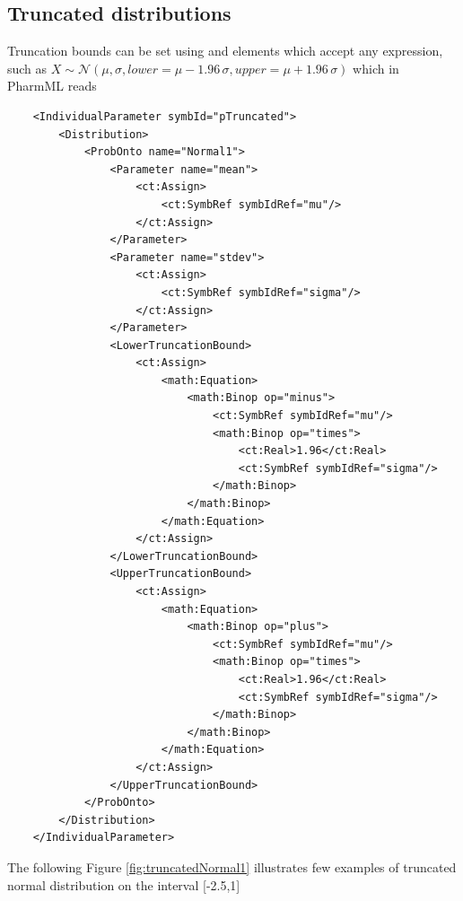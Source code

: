 \subsection{Truncated distributions}
Truncation bounds can be set using  and 
 elements which accept any expression, such as
$X \sim \mathcal N(\mu,\sigma,lower=\mu-1.96\,\sigma,upper=\mu+1.96\,\sigma)$
which in PharmML reads
\lstset{language=XML}
\begin{lstlisting}
    <IndividualParameter symbId="pTruncated">
        <Distribution>
            <ProbOnto name="Normal1">
                <Parameter name="mean">
                    <ct:Assign>
                        <ct:SymbRef symbIdRef="mu"/>
                    </ct:Assign>
                </Parameter>
                <Parameter name="stdev">
                    <ct:Assign>
                        <ct:SymbRef symbIdRef="sigma"/>
                    </ct:Assign>
                </Parameter>
                <LowerTruncationBound>
                    <ct:Assign>
                        <math:Equation>
                            <math:Binop op="minus">
                                <ct:SymbRef symbIdRef="mu"/>
                                <math:Binop op="times">
                                    <ct:Real>1.96</ct:Real>
                                    <ct:SymbRef symbIdRef="sigma"/>
                                </math:Binop>
                            </math:Binop>
                        </math:Equation>
                    </ct:Assign>
                </LowerTruncationBound>
                <UpperTruncationBound>
                    <ct:Assign>
                        <math:Equation>
                            <math:Binop op="plus">
                                <ct:SymbRef symbIdRef="mu"/>
                                <math:Binop op="times">
                                    <ct:Real>1.96</ct:Real>
                                    <ct:SymbRef symbIdRef="sigma"/>
                                </math:Binop>
                            </math:Binop>
                        </math:Equation>
                    </ct:Assign>
                </UpperTruncationBound>
            </ProbOnto>
        </Distribution>
    </IndividualParameter>
\end{lstlisting}
The following Figure \ref{fig:truncatedNormal1} illustrates few examples of truncated 
normal distribution on the interval [-2.5,1]
